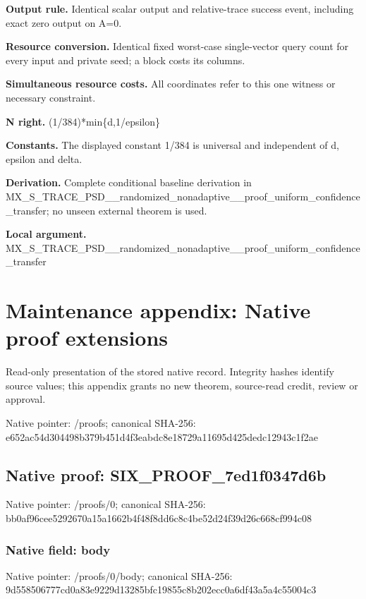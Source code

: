 \documentclass[10pt,a4paper]{article}
\begin{document}
\textbf{Output rule.} Identical scalar output and relative-trace success event, including exact zero output on A=0.

\textbf{Resource conversion.} Identical fixed worst-case single-vector query count for every input and private seed; a block costs its columns.

\textbf{Simultaneous resource costs.} All coordinates refer to this one witness or necessary constraint.

\textbf{N right.} (1/384)*min\{d,1/epsilon\}

\textbf{Constants.} The displayed constant 1/384 is universal and independent of d, epsilon and delta.

\textbf{Derivation.} Complete conditional baseline derivation in MX\_\allowbreak{}S\_\allowbreak{}TRACE\_\allowbreak{}PSD\_\allowbreak{}\_\allowbreak{}randomized\_\allowbreak{}nonadaptive\_\allowbreak{}\_\allowbreak{}proof\_\allowbreak{}uniform\_\allowbreak{}confidence\_\allowbreak{}transfer; no unseen external theorem is used.

\textbf{Local argument.} MX\_\allowbreak{}S\_\allowbreak{}TRACE\_\allowbreak{}PSD\_\allowbreak{}\_\allowbreak{}randomized\_\allowbreak{}nonadaptive\_\allowbreak{}\_\allowbreak{}proof\_\allowbreak{}uniform\_\allowbreak{}confidence\_\allowbreak{}transfer

\section{Maintenance appendix: Native proof extensions}
Read-only presentation of the stored native record. Integrity hashes identify source values; this appendix grants no new theorem, source-read credit, review or approval.

Native pointer: /proofs; canonical SHA-256: e652ac54d304498b379b451d4f3eabdc8e18729a11695d425dedc12943c1f2ae

\subsection{Native proof: SIX\_\allowbreak{}PROOF\_\allowbreak{}7ed1f0347d6b}
Native pointer: /proofs/0; canonical SHA-256: bb0af96cee5292670a15a1662b4f48f8dd6c8c4be52d24f39d26c668cf994c08

\subsubsection{Native field: body}
Native pointer: /proofs/0/body; canonical SHA-256: 9d558506777cd0a83e9229d13285bfc19855c8b202ecc0a6df43a5a4c55004c3
\end{document}
